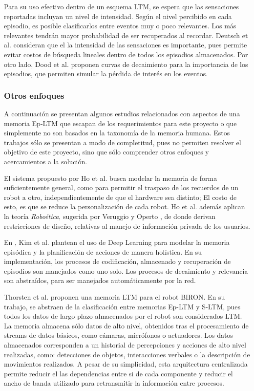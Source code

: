 Para su uso efectivo dentro de un esquema LTM, se espera que las sensaciones reportadas incluyan un nivel de intensidad. Según el nivel percibido en cada episodio, es posible clasificarlos entre eventos muy o poco relevantes. Los más relevantes tendrán mayor probabilidad de ser recuperados al recordar. Deutsch et al.  \cite{Deutsch2008} consideran que el la intensidad de las sensaciones es importante, pues permite evitar costos de búsqueda lineales dentro de todos los episodios almacenados. Por otro lado, Dood et al. proponen curvas de decaimiento para la importancia de los episodios, que permiten simular la pérdida de interés en los eventos.






\subsubsection{Otros enfoques}
A continuación se presentan algunos estudios relacionados con aspectos de una memoria Ep-LTM que escapan de los requerimientos para este proyecto o que simplemente no son basados en la taxonomía de la memoria humana. Estos trabajos sólo se presentan a modo de completitud, pues no permiten resolver el objetivo de este proyecto, sino que sólo comprender otros enfoques y acercamientos a la solución. 

El sistema propuesto por Ho et al. \cite{Ho2009} busca modelar la memoria de forma suficientemente general, como para permitir el traspaso de los recuerdos de un robot a otro, independientemente de que el hardware sea distinto; El costo de esto, es que se reduce la personalización de cada robot. Ho et al. además aplican la teoría \textit{Roboética}, sugerida por Veruggio y Operto \cite{Veruggio2006}, de donde derivan restricciones de diseño, relativas al manejo de información privada de los usuarios.

En \cite{KimMinJoo2016}, Kim et al. plantean el uso de Deep Learning para modelar la memoria episódica y la planificación de acciones de manera holística. En su implementación, los procesos de codificación, almacenado y recuperación de episodios son manejados como uno solo. Los procesos de decaimiento y relevancia son abstraídos, para ser manejados automáticamente por la red.

Thorsten et al. \cite{Spexard2008} proponen una memoria LTM para el robot BIRON. En su trabajo, se abstraen de la clasificación entre memorias Ep-LTM y S-LTM, pues todos los datos de largo plazo almacenados por el robot son considerados LTM. La memoria almacena sólo datos de alto nivel, obtenidos tras el procesamiento de streams de datos básicos, como cámaras, micrófonos o actuadores. Los datos almacenados corresponden a un historial de percepciones y acciones de alto nivel realizadas, como: detecciones de objetos, interacciones verbales o la descripción de movimientos realizados. A pesar de su simplicidad, esta arquitectura centralizada permite reducir el las dependencias entre si de cada componente y reducir el ancho de banda utilizado para retransmitir la información entre procesos.

